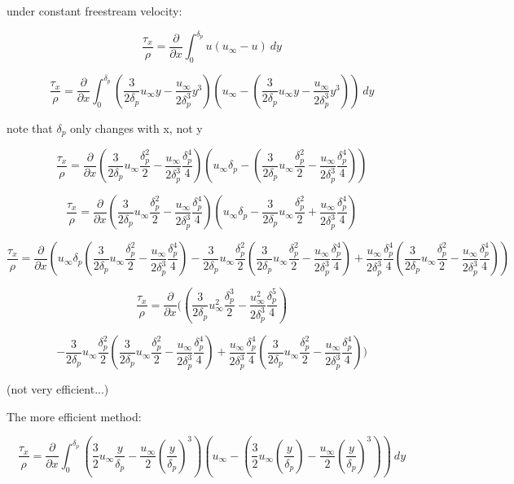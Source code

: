 \documentclass[11pt]{article}
\begin{document}
under constant freestream velocity:

$$ \frac{\tau_x}{\rho} =  \frac{\partial}{\partial x}   \int_0^{\delta_p} u( u_\infty - u) \ dy $$

$$ \frac{\tau_x}{\rho} =  \frac{\partial}{\partial x}   \int_0^{\delta_p} (\frac{3}{2 \delta_p} u_\infty y  - \frac{u_\infty}{2\delta_p^3} y^3)( u_\infty - (\frac{3}{2 \delta_p} u_\infty y  - \frac{u_\infty}{2\delta_p^3} y^3)) \ dy $$

note that $\delta_p$ only changes with x, not y

$$ \frac{\tau_x}{\rho} =  \frac{\partial}{\partial x}   (\frac{3}{2 \delta_p} u_\infty \frac{\delta_p^2}{2}  - \frac{u_\infty}{2\delta_p^3} \frac{\delta_p^4}{4})( u_\infty \delta_p - (\frac{3}{2 \delta_p} u_\infty \frac{\delta_p^2}{2} - \frac{u_\infty}{2\delta_p^3} \frac{\delta_p^4}{4}))  $$

$$ \frac{\tau_x}{\rho} =  \frac{\partial}{\partial x}   (\frac{3}{2 \delta_p} u_\infty \frac{\delta_p^2}{2}  - \frac{u_\infty}{2\delta_p^3} \frac{\delta_p^4}{4})( u_\infty \delta_p - \frac{3}{2 \delta_p} u_\infty \frac{\delta_p^2}{2} + \frac{u_\infty}{2\delta_p^3} \frac{\delta_p^4}{4})  $$


$$ \frac{\tau_x}{\rho} =  \frac{\partial}{\partial x}   ( u_\infty \delta_p (\frac{3}{2 \delta_p} u_\infty \frac{\delta_p^2}{2}  - \frac{u_\infty}{2\delta_p^3} \frac{\delta_p^4}{4}) - \frac{3}{2 \delta_p} u_\infty \frac{\delta_p^2}{2} (\frac{3}{2 \delta_p} u_\infty \frac{\delta_p^2}{2}  - \frac{u_\infty}{2\delta_p^3} \frac{\delta_p^4}{4})+ \frac{u_\infty}{2\delta_p^3} \frac{\delta_p^4}{4}(\frac{3}{2 \delta_p} u_\infty \frac{\delta_p^2}{2}  - \frac{u_\infty}{2\delta_p^3} \frac{\delta_p^4}{4}))  $$


$$ \frac{\tau_x}{\rho} =  \frac{\partial}{\partial x}   ( (\frac{3}{2 \delta_p} u_\infty^2 \frac{\delta_p^3}{2} - \frac{u_\infty^2}{2\delta_p^3} \frac{\delta_p^5}{4}) $$


$$ - \frac{3}{2 \delta_p} u_\infty \frac{\delta_p^2}{2} (\frac{3}{2 \delta_p} u_\infty \frac{\delta_p^2}{2}  - \frac{u_\infty}{2\delta_p^3} \frac{\delta_p^4}{4})+ \frac{u_\infty}{2\delta_p^3} \frac{\delta_p^4}{4}(\frac{3}{2 \delta_p} u_\infty \frac{\delta_p^2}{2}  - \frac{u_\infty}{2\delta_p^3} \frac{\delta_p^4}{4}))  $$

(not very efficient...)

The more efficient method:

$$ \frac{\tau_x}{\rho} =  \frac{\partial}{\partial x}   \int_0^{\delta_p} (\frac{3}{2} u_\infty \frac{y}{\delta_p}  - \frac{u_\infty}{2} (\frac{y}{\delta_p} )^3)( u_\infty - (\frac{3}{2} u_\infty (\frac{y}{\delta_p} )  - \frac{u_\infty}{2} (\frac{y}{\delta_p} )^3)) \ dy $$
\end{document}
